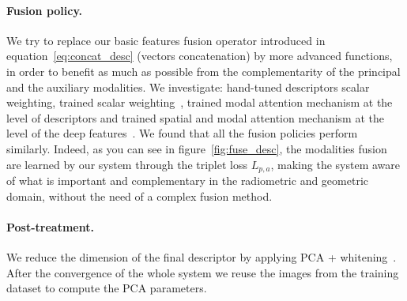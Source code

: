 \paragraph{Fusion policy.}
We try to replace our basic features fusion operator introduced in equation~\ref{eq:concat_desc} (vectors concatenation) by more advanced functions, in order to benefit as much as possible from the complementarity of the principal and the auxiliary modalities. We investigate: hand-tuned descriptors scalar weighting, trained scalar weighting~\cite{Sizikova2016}, trained modal attention mechanism at the level of descriptors and trained spatial and modal attention mechanism at the level of the deep features~\cite{Seymour2018}. We found that all the fusion policies perform similarly. Indeed, as you can see in figure~\ref{fig:fuse_desc}, the modalities fusion are learned by our system through the triplet loss $L_{p, a}$, making the system aware of what is important and complementary in the radiometric and geometric domain, without the need of a complex fusion method.

\paragraph{Post-treatment.}
We reduce the dimension of the final descriptor by applying PCA + whitening~\citep{Arandjelovic2017, Radenovic2016, Radenovic2017, Gordo2017}. After the convergence of the whole system we reuse the images from the training dataset to compute the PCA parameters.